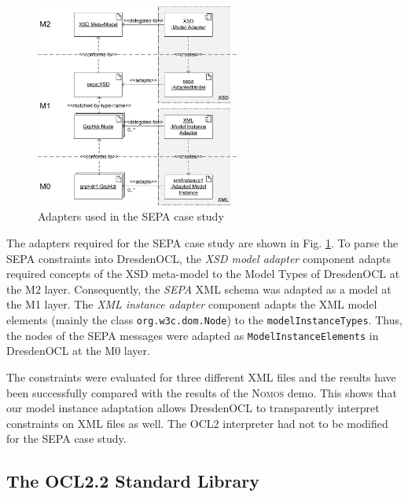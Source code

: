\begin{figure}[!t]
	\centering
		\includegraphics[width=0.60\textwidth]{figures/casestudy02.pdf}
	\caption{Adapters used in the SEPA case study
	  }
	\label{fig:casestudy02}
\end{figure}

The adapters required for the SEPA case study are shown in Fig.
\ref{fig:casestudy02}. To parse the SEPA constraints
into DresdenOCL, the \textit{XSD model adapter} component adapts required concepts of the 
XSD meta-model to the Model 
Types of DresdenOCL at the M2 layer. 
Consequently, the \textit{SEPA} XML schema was adapted as a model at the M1 layer.
The \textit{XML instance adapter} component 
adapts the XML model elements (mainly the class \texttt{org.w3c.dom.Node}) to the \texttt{model\-Instance\-Types}. 
Thus, the nodes of the SEPA messages
were adapted as \texttt{Model\-Instance\-Elements} in DresdenOCL at the M0 layer.

The constraints were evaluated for three different XML files 
and the results have been successfully compared with the results of the \textsc{Nomos} demo.
This shows that our model instance adaptation allows DresdenOCL to transparently interpret
constraints on XML files as well. The OCL2 interpreter had not to be modified for the SEPA case study.


\subsection{The OCL2.2 Standard Library}

